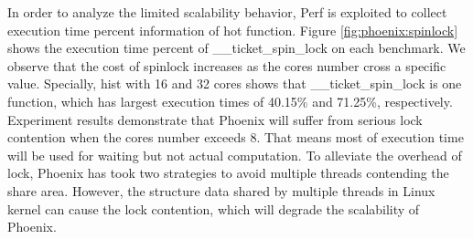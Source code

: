 In order to analyze the limited scalability behavior, 
Perf\cite{} is exploited to collect execution time  percent information of hot function. 
Figure \ref{fig:phoenix:spinlock} shows the execution time percent of \_\_ticket\_spin\_lock on each benchmark. 
We observe that the cost of spinlock increases as the cores number cross a specific value.
Specially, hist with 16 and 32 cores shows that \_\_ticket\_spin\_lock is one function, 
which has largest execution times  of 40.15\%  and 71.25\%, respectively. 
Experiment results demonstrate that Phoenix  will suffer from serious lock contention
when the cores number exceeds 8. 
That means most of execution time will be used for waiting but not actual computation.
To alleviate the overhead of lock, Phoenix has took two strategies to avoid multiple threads contending the share area.
However, the  structure data shared by multiple threads in Linux kernel can cause the lock contention, which 
will degrade the scalability of Phoenix.


